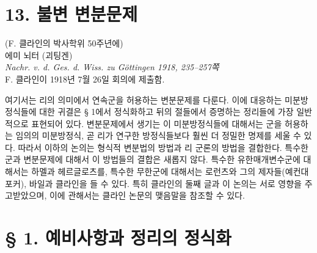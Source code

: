 
\section*{13. 불변 변분문제}

\begin{center}
(F. 클라인의 박사학위 50주년에)\\[0.6em]
에미 뇌터 (괴팅겐)\\[1em]
\emph{Nachr. v. d. Ges. d. Wiss. zu Göttingen 1918, 235--257쪽}\\[2em]
F. 클라인이 1918년 7월 26일 회의에 제출함.
\end{center}

여기서는 리의 의미에서 연속군을 허용하는 변분문제를 다룬다. 이에 대응하는 미분방정식들에 대한 귀결은 § 1에서 정식화하고 뒤의 절들에서 증명하는 정리들에 가장 일반적으로 표현되어 있다. 변분문제에서 생기는 이 미분방정식들에 대해서는 군을 허용하는 임의의 미분방정식, 곧 리가 연구한 방정식들보다 훨씬 더 정밀한 명제를 세울 수 있다. 따라서 이하의 논의는 형식적 변분법의 방법과 리 군론의 방법을 결합한다. 특수한 군과 변분문제에 대해서 이 방법들의 결합은 새롭지 않다. 특수한 유한매개변수군에 대해서는 하멜과 헤르글로츠를, 특수한 무한군에 대해서는 로런츠와 그의 제자들(예컨대 포커), 바일과 클라인을 들 수 있다. 특히 클라인의 둘째 글과 이 논의는 서로 영향을 주고받았으며, 이에 관해서는 클라인 논문의 맺음말을 참조할 수 있다.

\section*{§ 1. 예비사항과 정리의 정식화}

